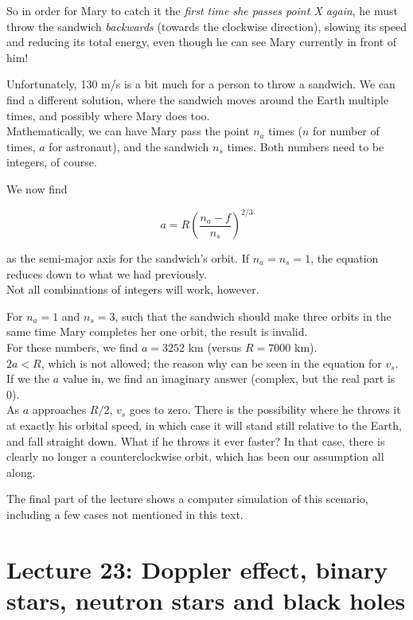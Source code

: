 So in order for Mary to catch it the \emph{first time she passes point X again}, he must throw the sandwich \emph{backwards} (towards the clockwise direction), slowing its speed and reducing its total energy, even though he can see Mary currently in front of him!

Unfortunately, 130 m/s is a bit much for a person to throw a sandwich. We can find a different solution, where the sandwich moves around the Earth multiple times, and possibly where Mary does too.\\
Mathematically, we can have Mary pass the point $n_a$ times ($n$ for number of times, $a$ for astronaut), and the sandwich $n_s$ times. Both numbers need to be integers, of course.

We now find

\begin{equation}
a = R \left(\frac{n_a - f}{n_s}\right)^{2/3}
\end{equation}

as the semi-major axis for the sandwich's orbit. If $n_a = n_s = 1$, the equation reduces down to what we had previously.\\
Not all combinations of integers will work, however.

For $n_a = 1$ and $n_s = 3$, such that the sandwich should make three orbits in the same time Mary completes her one orbit, the result is invalid.\\
For these numbers, we find $a = 3252$ km (versus $R = 7000$ km).\\
$2a < R$, which is not allowed; the reason why can be seen in the equation for $v_s$. If we the $a$ value in, we find an imaginary answer (complex, but the real part is 0).\\
As $a$ approaches $R/2$, $v_s$ goes to zero. There is the possibility where he throws it at exactly his orbital speed, in which case it will stand still relative to the Earth, and fall straight down. What if he throws it ever faster? In that case, there is clearly no longer a counterclockwise orbit, which has been our assumption all along.

The final part of the lecture shows a computer simulation of this scenario, including a few cases not mentioned in this text.

\section{Lecture 23: Doppler effect, binary stars, neutron stars and black holes}

